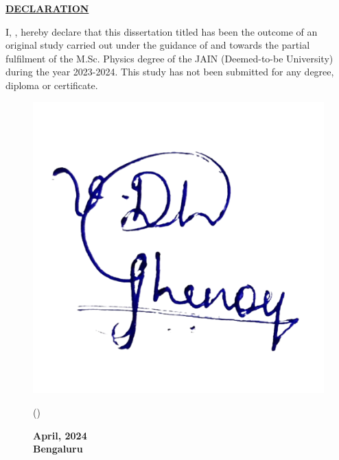 \thispagestyle{empty}

\begin{center}
    \Large

    \underline{\textbf{DECLARATION}}\\

\end{center}

\vspace{1.5cm}

\noindent
I, \textbf{\auth{}}, hereby declare that this dissertation titled \textbf{\projectname} has been the outcome of an original study carried out under the guidance of \textbf{\gnameOne} and \textbf{\gnameTwo} towards
the partial fulfilment of the M.Sc. Physics degree of the JAIN (Deemed-to-be University)
during the year 2023-2024. This study has not been submitted for any degree, diploma or
certificate.

\vspace{5cm}
\noindent

\begin{figure}[h!]
    \flushleft
    \hspace{0.5cm}
    \includegraphics[scale=0.125]{images/sign.png}
    \begin{minipage}{0.5\textwidth}
        \flushleft
        (\auth)

    \end{minipage}%
    \begin{minipage}{0.5\textwidth}
        \flushright

        \textbf{April, 2024\\
          Bengaluru}
    \end{minipage}
\end{figure}


